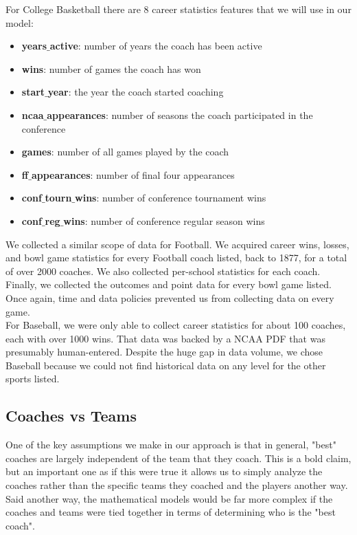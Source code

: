 \documentclass[11pt,notitlepage]{article}
\begin{document}
\noindent For College Basketball there are 8 career statistics features that we will use in our model:
\begin{itemize}
\item \textbf{years$\_$active}: number of years the coach has been active
\item \textbf{wins}: number of games the coach has won
\item \textbf{start$\_$year}: the year the coach started coaching
\item \textbf{ncaa$\_$appearances}: number of seasons the coach participated in the conference
\item \textbf{games}: number of all games played by the coach
\item \textbf{ff$\_$appearances}: number of final four appearances
\item \textbf{conf$\_$tourn$\_$wins}: number of conference tournament wins
\item \textbf{conf$\_$reg$\_$wins}: number of conference regular season wins
\end{itemize}

\noindent We collected a similar scope of data for Football. We acquired career wins, losses, and bowl game statistics for every Football coach listed, back to 1877, for a total of over 2000 coaches. We also collected per-school statistics for each coach. Finally, we collected the outcomes and point data for every bowl game listed. Once again, time and data policies prevented us from collecting data on every game.
\\

\noindent For Baseball, we were only able to collect career statistics for about 100 coaches, each with over 1000 wins.\cite{based} That data was backed by a NCAA PDF \cite{NCAAPDF} that was presumably human-entered. Despite the huge gap in data volume, we chose Baseball because we could not find historical data on any level for the other sports listed.
\\

\subsection{Coaches vs Teams}

One of the key assumptions we make in our approach is that in general, "best" coaches are largely independent of the team that they coach. This is a bold claim, but an important one as if this were true it allows us to simply analyze the coaches rather than the specific teams they coached and the players another way. Said another way, the mathematical models would be far more complex if the coaches and teams were tied together in terms of determining who is the "best coach". 
\\
\end{document}
